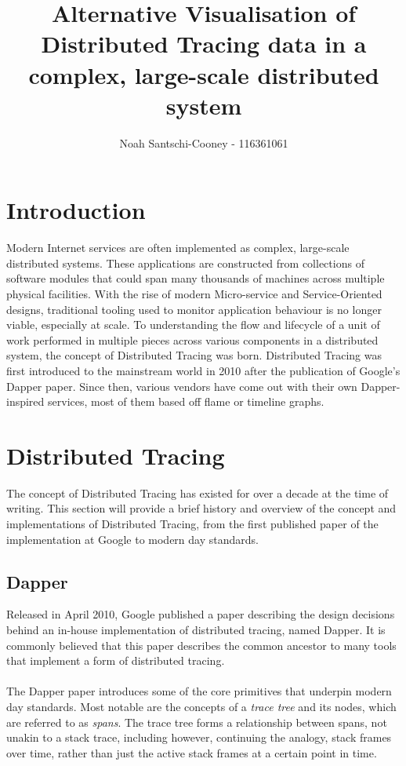 \documentclass[pdftex,titlepage]{article}
\author{Noah Santschi-Cooney - 116361061}
\title{Alternative Visualisation of Distributed Tracing data in a complex, large-scale distributed system}
\begin{document}
    \maketitle
    \section{Introduction}

    Modern Internet services are often implemented as complex, large-scale distributed systems. 
    These applications are constructed from collections of software modules that could span many
    thousands of machines across multiple physical facilities. With the rise of modern 
    Micro-service and Service-Oriented designs, traditional tooling used to monitor application 
    behaviour is no longer viable, especially at scale. To understanding the flow and lifecycle 
    of a unit of work performed in multiple pieces across various components in a distributed system, 
    the concept of Distributed Tracing was born. 
    Distributed Tracing was first introduced to the mainstream world in 2010 after the publication
    of Google’s Dapper paper. Since then, various vendors have come out with their own Dapper-inspired
    services, most of them based off flame or timeline graphs.

    \section{Distributed Tracing}
    The concept of Distributed Tracing has existed for over a decade at the time of writing. 
    This section will provide a brief history and overview of the concept and implementations of Distributed Tracing,
    from the first published paper of the implementation at Google to modern day standards.

        \subsection{Dapper}
        Released in April 2010,
        Google published a paper describing the design decisions behind an in-house implementation of distributed tracing,
        named Dapper. It is commonly believed that this paper describes the common ancestor to many tools that implement
        a form of distributed tracing.

        \paragraph{}
        The Dapper paper introduces some of the core primitives that underpin modern day standards. Most notable are the concepts
        of a \textit{trace tree} and its nodes, which are referred to as \textit{spans}. The trace tree forms a relationship between
        spans, not unakin to a stack trace, including however, continuing the analogy, stack frames over time, rather than just the 
        active stack frames at a certain point in time.
        
\end{document}
